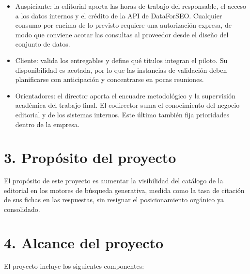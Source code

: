 \documentclass[
11pt, %
codirector, %
]{charter}
\begin{document}
\begin{itemize}
	\item Auspiciante: la editorial aporta las horas de trabajo del responsable, el acceso a los datos internos y el crédito de la API de DataForSEO. Cualquier consumo por encima de lo previsto requiere una autorización expresa, de modo que conviene acotar las consultas al proveedor desde el diseño del conjunto de datos.
	\item Cliente: valida los entregables y define qué títulos integran el piloto. Su disponibilidad es acotada, por lo que las instancias de validación deben planificarse con anticipación y concentrarse en pocas reuniones.
	\item Orientadores: el director aporta el encuadre metodológico y la supervisión académica del trabajo final. El codirector suma el conocimiento del negocio editorial y de los sistemas internos. Este último también fija prioridades dentro de la empresa.
\end{itemize}


\section{3. Propósito del proyecto}
\label{sec:proposito}

El propósito de este proyecto es aumentar la visibilidad del catálogo de la editorial en los motores de búsqueda generativa, medida como la tasa de citación de sus fichas en las respuestas, sin resignar el posicionamiento orgánico ya consolidado.

\section{4. Alcance del proyecto}
\label{sec:alcance}

El proyecto incluye los siguientes componentes:
\end{document}

